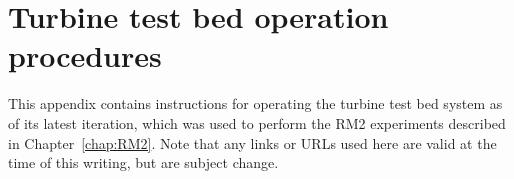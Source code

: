 \chapter{Turbine test bed operation procedures}
\doublespace

This appendix contains instructions for operating the turbine test bed system as
of its latest iteration, which was used to perform the RM2 experiments described
in Chapter~\ref{chap:RM2}. Note that any links or URLs used here are valid at
the time of this writing, but are subject change.


